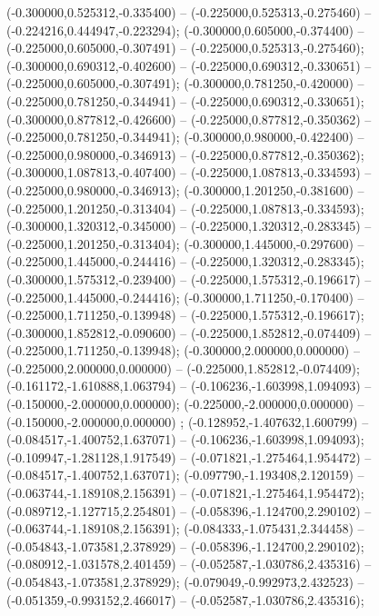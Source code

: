  (-0.300000,0.525312,-0.335400) -- (-0.225000,0.525313,-0.275460) -- (-0.224216,0.444947,-0.223294);
 (-0.300000,0.605000,-0.374400) -- (-0.225000,0.605000,-0.307491) -- (-0.225000,0.525313,-0.275460);
 (-0.300000,0.690312,-0.402600) -- (-0.225000,0.690312,-0.330651) -- (-0.225000,0.605000,-0.307491);
 (-0.300000,0.781250,-0.420000) -- (-0.225000,0.781250,-0.344941) -- (-0.225000,0.690312,-0.330651);
 (-0.300000,0.877812,-0.426600) -- (-0.225000,0.877812,-0.350362) -- (-0.225000,0.781250,-0.344941);
 (-0.300000,0.980000,-0.422400) -- (-0.225000,0.980000,-0.346913) -- (-0.225000,0.877812,-0.350362);
 (-0.300000,1.087813,-0.407400) -- (-0.225000,1.087813,-0.334593) -- (-0.225000,0.980000,-0.346913);
 (-0.300000,1.201250,-0.381600) -- (-0.225000,1.201250,-0.313404) -- (-0.225000,1.087813,-0.334593);
 (-0.300000,1.320312,-0.345000) -- (-0.225000,1.320312,-0.283345) -- (-0.225000,1.201250,-0.313404);
 (-0.300000,1.445000,-0.297600) -- (-0.225000,1.445000,-0.244416) -- (-0.225000,1.320312,-0.283345);
 (-0.300000,1.575312,-0.239400) -- (-0.225000,1.575312,-0.196617) -- (-0.225000,1.445000,-0.244416);
 (-0.300000,1.711250,-0.170400) -- (-0.225000,1.711250,-0.139948) -- (-0.225000,1.575312,-0.196617);
 (-0.300000,1.852812,-0.090600) -- (-0.225000,1.852812,-0.074409) -- (-0.225000,1.711250,-0.139948);
 (-0.300000,2.000000,0.000000) -- (-0.225000,2.000000,0.000000) -- (-0.225000,1.852812,-0.074409);
 (-0.161172,-1.610888,1.063794) -- (-0.106236,-1.603998,1.094093) -- (-0.150000,-2.000000,0.000000);
 (-0.225000,-2.000000,0.000000) -- (-0.150000,-2.000000,0.000000) ;
 (-0.128952,-1.407632,1.600799) -- (-0.084517,-1.400752,1.637071) -- (-0.106236,-1.603998,1.094093);
 (-0.109947,-1.281128,1.917549) -- (-0.071821,-1.275464,1.954472) -- (-0.084517,-1.400752,1.637071);
 (-0.097790,-1.193408,2.120159) -- (-0.063744,-1.189108,2.156391) -- (-0.071821,-1.275464,1.954472);
 (-0.089712,-1.127715,2.254801) -- (-0.058396,-1.124700,2.290102) -- (-0.063744,-1.189108,2.156391);
 (-0.084333,-1.075431,2.344458) -- (-0.054843,-1.073581,2.378929) -- (-0.058396,-1.124700,2.290102);
 (-0.080912,-1.031578,2.401459) -- (-0.052587,-1.030786,2.435316) -- (-0.054843,-1.073581,2.378929);
 (-0.079049,-0.992973,2.432523) -- (-0.051359,-0.993152,2.466017) -- (-0.052587,-1.030786,2.435316);
